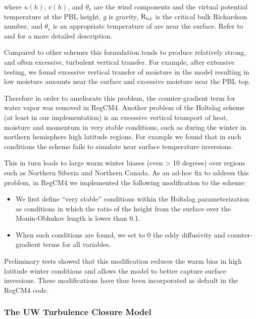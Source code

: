 where $u(h)$, $v(h)$, and $\theta_v$ are the wind components and the
virtual potential temperature at the PBL height, $g$ is gravity, ${\rm {R_i}_{cr}}$
is the critical bulk Richardson number, and $\theta_s$ is an appropriate
temperature of are near the surface.  Refer to \cite{Holtslag_90} and
\cite{Holtslag_93} for a more detailed description.

Compared to other schemes this formulation tends to produce relatively strong,
and often excessive, turbulent vertical transfer.
For example, after extensive testing, we found excessive vertical transfer
of moisture in the model resulting in low moisture amounts near the surface
and excessive moisture near the PBL top.

Therefore in order to ameliorate this problem, the counter-gradient term for
water vapor was removed in \ac{RegCM4}. Another problem of the Holtslag scheme
(at least in our implementation) is an excessive vertical transport of heat,
moisture and momentum in very stable conditions, such as during the winter in
northern hemisphere high latitude regions. For example we found that in such
conditions the scheme fails to simulate near surface temperature inversions.

This in turn leads to large warm winter biases (even > 10 degrees) over regions
such as Northern Siberia and Northern Canada. As an ad-hoc fix to address this
problem, in \ac{RegCM4} we implemented the following modification to the scheme:

\begin{itemize}
\item We first define “very stable” conditions within the Holtslag
parameterization as conditions in which the ratio of the height from the
surface over the Monin-Obhukov length is lower than 0.1.
\item When such conditions are found, we set to 0 the eddy diffusivity
and counter-gradient terms for all variables.
\end{itemize}

Preliminary tests showed that this modification reduces the warm bias in high
latitude winter conditions and allows the model to better capture surface
inversions. These modifications have thus been incorporated as default in the
\ac{RegCM4} code.

\subsubsection{The UW Turbulence Closure Model}

